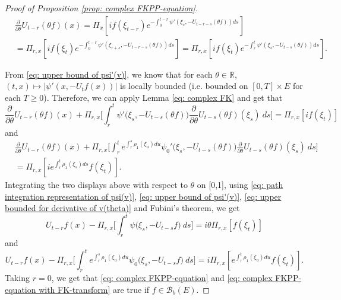 \documentclass[12pt,a4paper]{amsart}
\theoremstyle{plain}
\theoremstyle{definition}
\numberwithin{equation}{section}
\begin{document}
\begin{proof}[Proof of Proposition \ref{prop: complex FKPP-equation}]
\begin{align}
    &\frac{\partial}{\partial \theta} U_{t-r}(\theta f)( x)
    = \Pi_x[ i f(\xi_{t-r}) e^{-\int_0^{t-r} \psi'(\xi_s, -U_{t-r-s}(\theta f)) ds} ]
    \\&= \Pi_{r,x}[i f(\xi_t)e^{-\int_0^{t-r} \psi'(\xi_{r+s}, -U_{t-r-s}(\theta f)) ds} ]
    = \Pi_{r,x}[if(\xi_t)e^{-\int_r^t \psi'(\xi_{s}, -U_{t-s}(\theta f)) ds} ].
\end{align}

    From \eqref{eq: upper bound of psi'(v)}, we know that for each $\theta\in \mathbb R$, $(t,x) \mapsto |\psi'(x,-U_tf(x))|$ is locally bounded (i.e. bounded on $[0,T]\times E$ for each $T \geq 0$).
    Therefore, we can apply Lemma \ref{eq: complex FK} and get that
\[
    \frac{\partial}{\partial \theta} U_{t-r}(\theta f)(x) + \Pi_{r,x} \Big[\int_r^t \psi'\big(\xi_s,- U_{t-s}(\theta f)\big)\frac{\partial}{\partial \theta} U_{t-s}(\theta f)(\xi_s)~ds\Big]
    = \Pi_{r,x} [i f(\xi_t)]
\]
    and
\begin{align}
    &\frac{\partial}{\partial \theta} U_{t-r}(\theta f)(x) + \Pi_{r,x} \Big[\int_r^t e^{\int_r^s \rho_1(\xi_u)du}\psi_0'\big(\xi_s,- U_{t-s}(\theta f)\big)\frac{\partial}{\partial \theta} U_{t-s}(\theta f)(\xi_s)~ds\Big]\\
    &= \Pi_{r,x} [i e^{\int_r^t \rho_1(\xi_s)ds}f(\xi_t)].
\end{align}
    Integrating the two displays above with respect to $\theta$  on [0,1], using \eqref{eq: path integration representation of psi(v)}, \eqref{eq: upper bound of psi'(v)}, \eqref{eq: upper bounded for derivative of v(theta)} and Fubini's theorem, we get
\begin{equation}
    U_{t-r}f(x) - \Pi_{r,x} \Big[\int_r^t \psi\big(\xi_s,-U_{t-s}f\big) ~ds\Big]
    = i\theta \Pi_{r,x} [f(\xi_t)]
\end{equation}
    and
\begin{equation}
    U_{t-r}f(x) - \Pi_{r,x} \Big[\int_r^t e^{\int_r^s \rho_1(\xi_u)du} \psi_0\big(\xi_s,- U_{t-s}f\big) ~ds\Big]
    = i\Pi_{r,x} [e^{\int_r^t\rho_1(\xi_u)du}f(\xi_t)].
\end{equation}
    Taking $r = 0$, we get that \eqref{eq: complex FKPP-equation} and \eqref{eq: complex FKPP-equation with FK-transform} are true if $f\in \mathcal B_b(E)$.


\end{proof}
\end{document}
